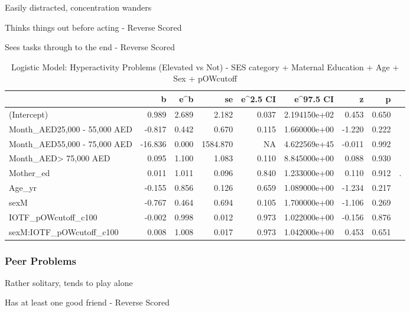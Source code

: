 \documentclass[
]{article}
\begin{document}
Easily distracted, concentration wanders

Thinks things out before acting - Reverse Scored

Sees tasks through to the end - Reverse Scored

\FloatBarrier

\begin{table}[!h]

\caption{\label{tab:IOTF_pOWcutoff_hypeprobs_elevated_logit}Logistic Model: Hyperactivity Problems (Elevated vs Not) - SES category + Maternal Education + Age + Sex + pOWcutoff}
\centering
\begin{tabular}[t]{lrrrrrrrl}
\toprule
  & b & e\textasciicircum{}b & se & e\textasciicircum{}2.5 CI & e\textasciicircum{}97.5 CI & z & p &  \\
\midrule
(Intercept) & 0.989 & 2.689 & 2.182 & 0.037 & 2.194150e+02 & 0.453 & 0.650 & \\
Month\_AED25,000 - 55,000 AED & -0.817 & 0.442 & 0.670 & 0.115 & 1.660000e+00 & -1.220 & 0.222 & \\
Month\_AED55,000 - 75,000 AED & -16.836 & 0.000 & 1584.870 & NA & 4.622569e+45 & -0.011 & 0.992 & \\
Month\_AED> 75,000 AED & 0.095 & 1.100 & 1.083 & 0.110 & 8.845000e+00 & 0.088 & 0.930 & \\
Mother\_ed & 0.011 & 1.011 & 0.096 & 0.840 & 1.233000e+00 & 0.110 & 0.912 & .\\
\addlinespace
Age\_yr & -0.155 & 0.856 & 0.126 & 0.659 & 1.089000e+00 & -1.234 & 0.217 & \\
sexM & -0.767 & 0.464 & 0.694 & 0.105 & 1.700000e+00 & -1.106 & 0.269 & \\
IOTF\_pOWcutoff\_c100 & -0.002 & 0.998 & 0.012 & 0.973 & 1.022000e+00 & -0.156 & 0.876 & \\
sexM:IOTF\_pOWcutoff\_c100 & 0.008 & 1.008 & 0.017 & 0.973 & 1.042000e+00 & 0.453 & 0.651 & \\
\bottomrule
\end{tabular}
\end{table}

\FloatBarrier

\hypertarget{peer-problems}{%
\subsubsection{Peer Problems}\label{peer-problems}}

Rather solitary, tends to play alone

Has at least one good friend - Reverse Scored
\end{document}
